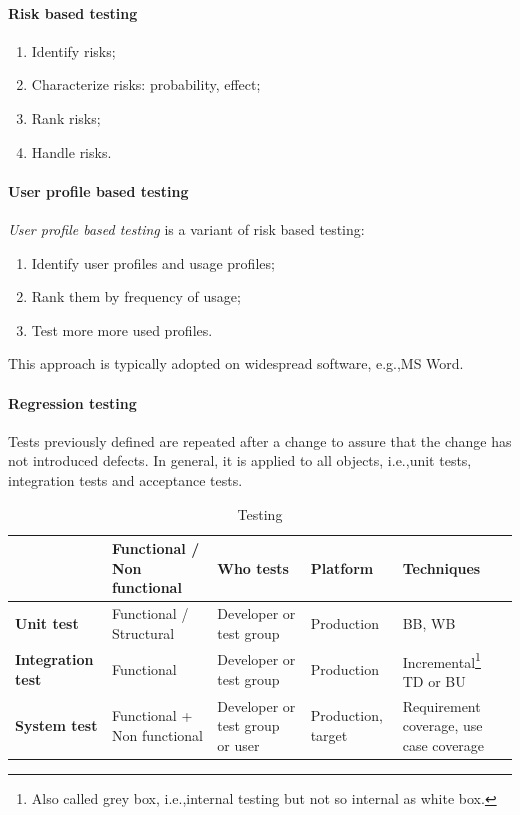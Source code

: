 \paragraph{Risk based testing}
\begin{enumerate}
\item Identify risks;
\item Characterize risks: probability, effect;
\item Rank risks;
\item Handle risks.
\end{enumerate}

\paragraph{User profile based testing}
\emph{User profile based testing} is a variant of risk based testing:
\begin{enumerate}
\item Identify user profiles and usage profiles;
\item Rank them by frequency of usage;
\item Test more more used profiles.
\end{enumerate}
This approach is typically adopted on widespread software, e.g.,\@ MS Word.

\paragraph{Regression testing}
Tests previously defined are repeated after a change to assure that the change has not introduced defects. In general, it is applied to all objects, i.e.,\@ unit tests, integration tests and acceptance tests.

\begin{table}
\centering
\small
\begin{tabularx}{0.95 \textwidth}{|X|X|X|X|X|}
\hline 
 & Functional / Non functional & Who tests & Platform & Techniques \\ 
\hline
\textbf{Unit test} & Functional / Structural & Developer or test group & Production  & BB, WB\\ 
\hline 
\textbf{Integration test} & Functional & Developer or test group & Production & Incremental\footnote{Also called grey box, i.e.,\@ internal testing but not so internal as white box.} TD or BU\\ 
\hline 
\textbf{System test} & Functional + Non functional & Developer or test group or user & Production, target & Requirement coverage, use case coverage \\ 
\hline 
\end{tabularx}
\caption{Testing}
\end{table}

